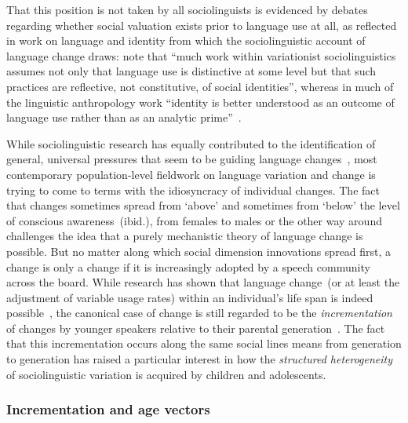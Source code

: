 That this position is not taken by all sociolinguists is evidenced by debates regarding whether social valuation exists prior to language use at all, as reflected in work on language and identity from which the sociolinguistic account of language change draws: \citeauthor{Bucholtz2004} note that ``much work within variationist sociolinguistics assumes not only that language use is distinctive at some level but that such practices are reflective, not constitutive, of social identities'', whereas in much of the linguistic anthropology work ``identity is better understood as an outcome of language use rather than as an analytic prime''~\citep[p.376]{Bucholtz2004}.

While sociolinguistic research has equally contributed to the identification of general, universal pressures that seem to be guiding language changes~\citep[see][for an extensive summary in relation to sound changes in particular]{Labov1994}, most contemporary population-level fieldwork on language variation and change is trying to come to terms with the idiosyncracy of individual changes. The fact that changes sometimes spread from `above' and sometimes from `below' the level of conscious awareness~(ibid.), from females to males or the other way around~\citep{Milroy1985,Eckert1989,Labov2001,Sundgren2001} challenges the idea that a purely mechanistic theory of language change is possible.
But no matter along which social dimension innovations spread first, a change is only a change if it is increasingly adopted by a speech community across the board. While research has shown that %
language change~(or at least the adjustment of variable usage rates) within an individual's life span is indeed possible~\citep{Sankoff2007,Buchstaller2015}, the canonical case of change is still regarded to be the \emph{incrementation} of changes by younger speakers relative to their parental generation~\citep{Labov2001,Tagliamonte2009}. The fact that this incrementation occurs along the same social lines means from generation to generation has raised a particular interest in how the \emph{structured heterogeneity} of sociolinguistic variation is acquired by children and adolescents.

\subsubsection{Incrementation and age vectors}
\label{sec:agevector}


